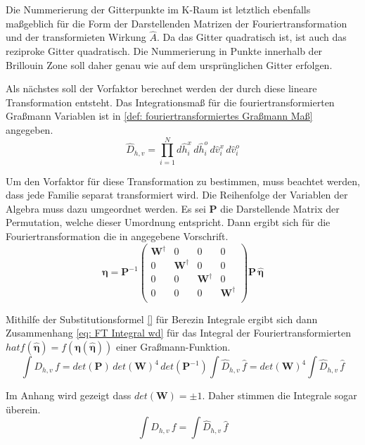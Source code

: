\noindent Die Nummerierung der Gitterpunkte im K-Raum ist letztlich ebenfalls maßgeblich für die Form der Darstellenden Matrizen der Fouriertransformation und der transformieten Wirkung $\hat{A}$. Da das Gitter quadratisch ist, ist auch das reziproke Gitter quadratisch. Die Nummerierung in Punkte innerhalb der Brillouin Zone soll daher genau wie auf dem ursprünglichen Gitter erfolgen.

\noindent Als nächstes soll der Vorfaktor berechnet werden der durch diese lineare Transformation entsteht. Das Integrationsmaß für die fouriertransformierten Graßmann Variablen ist in \eqref{def: fouriertransformiertes Graßmann Maß} angegeben.
\begin{equation} \label{def: fouriertransformiertes Graßmann Maß}
\hat{D}_{h,v} = \prod_{i = 1}^N d\hat{h}_{i}^x\,d\hat{h}_{i}^o\,d\hat{v}_{i}^x\,d\hat{v}_{i}^o
\end{equation}

\noindent Um den Vorfaktor für diese Transformation zu bestimmen, muss beachtet werden, dass jede Familie separat transformiert wird. Die Reihenfolge der Variablen der Algebra muss dazu umgeordnet werden. Es sei $\bm{P}$ die Darstellende Matrix der Permutation, welche dieser Umordnung entspricht. Dann ergibt sich für die Fouriertransformation die in angegebene Vorschrift.
\begin{equation}
\bm{\eta} = \bm{P}^{-1} \left(\begin{array}{cccc} 
               \bm{W}^{\dagger}  &0&0&0 \\
        0&     \bm{W}^{\dagger}  &0&0 \\
        0&0&   \bm{W}^{\dagger}  &0 \\
        0&0&0& \bm{W}^{\dagger}   \\
    \end{array}\right) 
    \bm{P} \, \bm{\hat{\eta}}
\end{equation}

\noindent Mithilfe der Substitutionsformel \eqref{} für Berezin Integrale ergibt sich dann Zusammenhang \eqref{eq: FT Integral wd} für das Integral der Fouriertransformierten $hat{f}(\bm{\hat{\eta}}) = f(\bm{\eta}(\bm{\hat{\eta}}))$ einer Graßmann-Funktion. 
\begin{equation} \label{eq: FT Integral wd}
 \int D_{h,v} \, f  = det(\bm{P})\,det(\bm{W})^4\, det(\bm{P}^{-1}) \int \hat{D}_{h,v} \, \hat{f}  =  det(\bm{W})^4 \int \hat{D}_{h,v} \, \hat{f}
\end{equation} 

\noindent Im Anhang wird gezeigt dass $det(\bm{W}) = \pm 1$. Daher stimmen die Integrale sogar überein.  
\begin{equation} \label{eq: FT Integral}
 \int D_{h,v} \, f  = \int \hat{D}_{h,v} \, \hat{f}
\end{equation}

